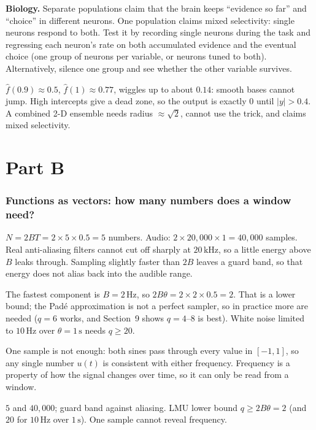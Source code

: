 \documentclass[11pt,letterpaper]{article}
\newcommand{\ans}[1]{\par\vspace{4pt}{\bfseries #1}\quad}
\begin{document}
\textbf{Biology.} Separate populations claim that the brain keeps ``evidence so far'' and ``choice'' in different neurons. One population claims mixed selectivity: single neurons respond to both. Test it by recording single neurons during the task and regressing each neuron's rate on both accumulated evidence and the eventual choice (one group of neurons per variable, or neurons tuned to both). Alternatively, silence one group and see whether the other variable survives.
\begin{result}
$\hat f(0.9) \approx 0.5$, $\hat f(1) \approx 0.77$, wiggles up to about $0.14$: smooth bases cannot jump. High intercepts give a dead zone, so the output is exactly $0$ until $|y| > 0.4$. A combined 2-D ensemble needs radius $\approx \sqrt2$, cannot use the trick, and claims mixed selectivity.
\end{result}

\part*{Part B}

\section{Functions as vectors: how many numbers does a window need?}

\ans{Q1}
$N = 2BT = 2 \times 5 \times 0.5 = 5$ numbers. Audio: $2 \times 20{,}000 \times 1 = 40{,}000$ samples. Real anti-aliasing filters cannot cut off sharply at $20\,\mathrm{kHz}$, so a little energy above $B$ leaks through. Sampling slightly faster than $2B$ leaves a guard band, so that energy does not alias back into the audible range.

\ans{Q2}
The fastest component is $B = 2\,\mathrm{Hz}$, so $2B\theta = 2 \times 2 \times 0.5 = 2$. That is a lower bound; the Pad\'e approximation is not a perfect sampler, so in practice more are needed ($q = 6$ works, and Section~9 shows $q = 4$--$8$ is best). White noise limited to $10\,\mathrm{Hz}$ over $\theta = 1\,\mathrm{s}$ needs $q \ge 20$.

One sample is not enough: both sines pass through every value in $[-1, 1]$, so any single number $u(t)$ is consistent with either frequency. Frequency is a property of how the signal changes over time, so it can only be read from a window.
\begin{result}
$5$ and $40{,}000$; guard band against aliasing. LMU lower bound $q \ge 2B\theta = 2$ (and $20$ for $10\,\mathrm{Hz}$ over $1\,\mathrm{s}$). One sample cannot reveal frequency.
\end{result}
\end{document}
